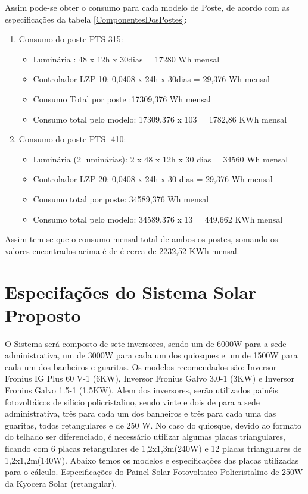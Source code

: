 	Assim pode-se obter o consumo para cada modelo de Poste, de acordo com as especifica\c{c}\~oes  da tabela \ref{ComponentesDosPostes}:
	
\begin{enumerate}
         \item Consumo do poste PTS-315:
                  \begin{itemize}
                            \item Lumin\'aria : 48 x 12h x 30dias = 17280 Wh mensal
                            \item Controlador LZP-10: 0,0408 x 24h x 30dias = 29,376 Wh mensal 
                            \item Consumo Total por poste :17309,376 Wh mensal
                            \item Consumo total pelo modelo: 17309,376 x 103 = 1782,86 KWh mensal
                  \end{itemize}
         \item Consumo do poste PTS- 410:
                  \begin{itemize}
                            \item Lumin\'aria (2 lumin\'arias): 2 x 48 x 12h x 30 dias = 34560 Wh mensal
                            \item Controlador LZP-20:  0,0408 x 24h x 30 dias = 29,376 Wh mensal  
                            \item Consumo total por poste: 34589,376 Wh mensal
                            \item Consumo total pelo modelo:  34589,376 x 13 = 449,662 KWh mensal
                  \end{itemize}
\end{enumerate}

	Assim tem-se que o consumo mensal total de ambos os postes, somando os valores encontrados acima \'e de  \'e cerca de 2232,52 KWh mensal.
	
\chapter{Especifações do Sistema Solar Proposto}

O Sistema será composto de sete inversores, sendo um de 6000W para a sede administrativa, um de 3000W para cada um dos quiosques e um de 1500W para cada um dos banheiros e guaritas. Os modelos recomendados são: Inversor Fronius IG Plus 60 V-1 (6KW), Inversor Fronius Galvo 3.0-1 (3KW) e Inversor Fronius Galvo 1.5-1 (1,5KW).
	Alem dos inversores, serão utilizados painéis fotovoltáicos de silicio policristalino, sendo vinte e dois de para a sede administrativa, três para cada um dos banheiros e três para cada uma das guaritas, todos retangulares e de 250 W. No caso do quiosque, devido ao formato do telhado ser diferenciado, é necessário utilizar algumas placas triangulares, ficando com 6 placas retangulares de 1,2x1,3m(240W) e 12 placas triangulares de 1,2x1,2m(140W). Abaixo temos os modelos e especificações das placas utilizadas para o cálculo.
	Especificações do Painel Solar Fotovoltaico Policristalino de 250W da Kyocera Solar (retangular).
	
